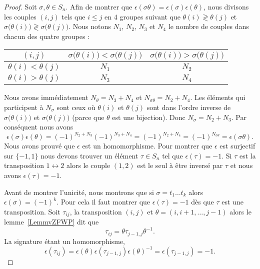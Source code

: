 \begin{proof}
	Soit \( \sigma,\theta \in S_n\). Afin de montrer que \( \epsilon(\sigma\theta )=\epsilon(\sigma)\epsilon(\theta )\), nous divisons les couples \( (i,j)\) tels que \( i\leq j\) en \( 4\) groupes suivant que \( \theta(i)\gtrless \theta(j)\) et \( \sigma\big( \theta(i) \big)\gtrless \sigma\big( \theta(j) \big)\). Nous notons \( N_1\), \( N_2\), \( N_3\) et \( N_4\) le nombre de couples dans chacun des quatre groupes :
	\begin{center}
		\begin{tabular}{c|c|c}
			\(  (i,j)\)              & \(\sigma\big( \theta(i) \big)<\sigma\big( \theta(j) \big)\) & \(\sigma\big( \theta(i) \big)>\sigma\big( \theta(j) \big)\) \\
			\hline
			\( \theta(i)<\theta(j)\) & \( N_1\)                                                    & \( N_2\)                                                    \\
			\hline
			\( \theta(i)>\theta(j)\) & \( N_3\)                                                    & \( N_4\)
		\end{tabular}
	\end{center}
	Nous avons immédiatement \( N_\theta=N_3+N_4\) et \( N_{\sigma\theta}=N_2+N_4\). Les éléments qui participent à \( N_\sigma\) sont ceux où \( \theta(i)\) et \(\theta(j)\) sont dans l'ordre inverse de \( \sigma\big( \theta(i) \big)\) et \( \sigma\big( \theta(j) \big)\) (parce que \(  \theta\) est une bijection). Donc \( N_\sigma=N_2+N_3\). Par conséquent nous avons
	\begin{equation}
		\epsilon(\sigma)\epsilon(\theta)=(-1)^{N_2+N_3}(-1)^{N_3+N_4}=(-1)^{N_2+N_4}=(-1)^{N_{\sigma\theta}}=\epsilon(\sigma\theta).
	\end{equation}
	Nous avons prouvé que \( \epsilon\) est un homomorphisme. Pour montrer que \( \epsilon\) est surjectif sur \( \{ -1,1 \}\) nous devons trouver un élément \( \tau\in S_n\) tel que \( \epsilon(\tau)=-1\). Si \( \tau\) est la transposition \( 1\leftrightarrow 2\) alors le couple \( (1,2)\) est le seul à être inversé par \( \tau\) et nous avons \( \epsilon(\tau)=-1\).

	Avant de montrer l'unicité, nous montrons que si \( \sigma=t_1\ldots t_k\) alors \( \epsilon(\sigma)=(-1)^k\). Pour cela il faut montrer que \( \epsilon(\tau)=-1\) dès que \( \tau\) est une transposition. Soit \( \tau_{ij}\), la transposition \( (i,j)\) et \( \theta=(i,i+1,\ldots, j-1)\) alors le lemme~\ref{LemmvZFWP} dit que
	\begin{equation}
		\tau_{ij}=\theta\tau_{j-1,j}\theta^{-1}.
	\end{equation}
	La signature étant un homomorphisme,
	\begin{equation}
		\epsilon(\tau_{ij})=\epsilon(\theta)\epsilon(\tau_{j-1,j})\epsilon(\theta)^{-1}=\epsilon(\tau_{j-1,j})=-1.
	\end{equation}


\end{proof}
